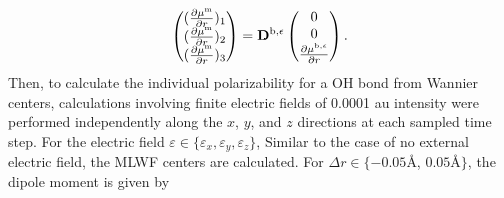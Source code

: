         \begin{subequations}
          \begin{align}
            \left(
            \begin{matrix}
              (\frac{\partial \mu^\text{m}}{\partial r})_1\\
              (\frac{\partial \mu^\text{m}}{\partial r})_2\\
              (\frac{\partial \mu^\text{m}}{\partial r})_3
            \end{matrix}
            \right)
            = {\bf D}^{\text{b},\epsilon}
            \left(
            \begin{matrix}
              0\\
              0\\
              \frac{\partial \mu^{\text{b},\epsilon}}{\partial r}
            \end{matrix}
            \right).
            \end{align}
        \end{subequations}
    Then, to calculate the individual polarizability for a OH bond from Wannier centers, 
    calculations involving finite electric fields of 0.0001 au intensity were performed independently 
    along the $x$, $y$, and $z$ directions at each sampled time step.\cite{sulpizi2013}
    For the electric field $\varepsilon \in \{\varepsilon_x,\varepsilon_y, \varepsilon_z\}$,
        Similar to the case of no external electric field, the MLWF centers are calculated. %
 For $\Delta r \in \{-0.05 $\AA, $0.05 $\AA $\}$, the dipole moment is given by 
